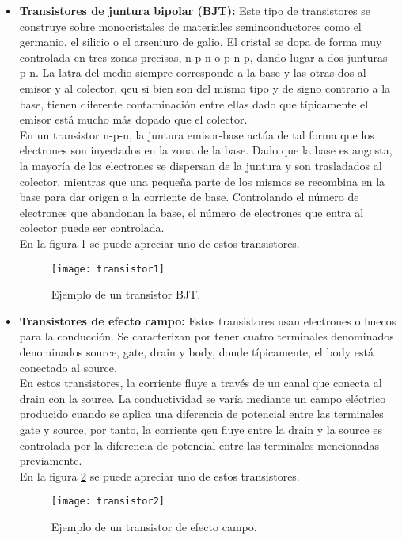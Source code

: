 \documentclass{scrartcl}
\begin{document}
\begin{itemize}
	\item \textbf{Transistores de juntura bipolar (BJT):} Este tipo de transistores se construye sobre monocristales de materiales seminconductores como el germanio, el silicio o el arseniuro de galio. El cristal se dopa de forma muy controlada en tres zonas precisas, n-p-n o p-n-p, dando lugar a dos junturas p-n. La latra del medio siempre corresponde a la base y las otras dos al emisor y al colector, qeu si bien son del mismo tipo y de signo contrario a la base, tienen diferente contaminación entre ellas dado que típicamente el emisor está mucho más dopado que el colector.\\
	
	En un transistor n-p-n, la juntura emisor-base actúa de tal forma que los electrones son inyectados en la zona de la base. Dado que la base es angosta, la mayoría de los electrones se dispersan de la juntura y son trasladados al colector, mientras que una pequeña parte de los mismos se recombina en la base para dar origen a la corriente de base. Controlando el número de electrones que abandonan la base, el número de electrones que entra al colector puede ser controlada. \\
	
	En la figura \ref{fig: transistor1} se puede apreciar uno de estos transistores.
	
	\begin{figure}[h!]
		\centering
		\texttt{[image: transistor1]}
		\caption{Ejemplo de un transistor BJT.}
		\label{fig: transistor1}
	\end{figure}
	
	\item \textbf{Transistores de efecto campo:} Estos transistores usan electrones o huecos para la conducción. Se caracterizan por tener cuatro terminales denominados denominados source, gate, drain y body, donde típicamente, el body está conectado al source.\\
	
	En estos transistores, la corriente fluye a través de un canal que conecta al drain con la source. La conductividad se varía mediante un campo eléctrico producido cuando se aplica una diferencia de potencial entre las terminales gate y source, por tanto, la corriente qeu fluye entre la drain y la source es controlada por la diferencia de potencial entre las terminales mencionadas previamente.\\
	
	En la figura \ref{fig: transistor2} se puede apreciar uno de estos transistores.
	
	\begin{figure}[h!]
		\centering
		\texttt{[image: transistor2]}
		\caption{Ejemplo de un transistor de efecto campo.}
		\label{fig: transistor2}
	\end{figure}
	 
\end{itemize}
\end{document}
